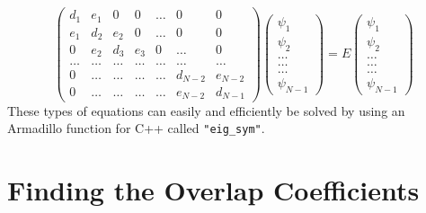 \documentclass[../main.tex]{subfiles}
\begin{document}
\begin{equation}
    \left( \begin{array}{ccccccc} d_1 & e_1 & 0   & 0    & \dots  &0     & 0 \\
                                e_1 & d_2 & e_2 & 0    & \dots  &0     &0 \\
                                0   & e_2 & d_3 & e_3  &0       &\dots & 0\\
                                \dots  & \dots & \dots & \dots  &\dots      &\dots & \dots\\
                                0   & \dots & \dots & \dots  &\dots       &d_{N-2} & e_{N-2}\\
                                0   & \dots & \dots & \dots  &\dots       &e_{N-2} & d_{N-1}

             \end{array} \right)      \left( \begin{array}{c} \psi_{1} \\
                                                              \psi_{2} \\
                                                              \dots\\ \dots\\ \dots\\
                                                              \psi_{N-1}
             \end{array} \right)=E \left( \begin{array}{c} \psi_{1} \\
                                                              \psi_{2} \\
                                                              \dots\\ \dots\\ \dots\\
                                                              \psi_{N-1}
             \end{array} \right) 
      \label{eq:sematrix}
\end{equation}
These types of equations can easily and efficiently be solved by using an Armadillo function for C++ called \texttt{"eig\_sym"}.




\section{Finding the Overlap Coefficients}\label{sec:FindingCoefficients}
\end{document}
